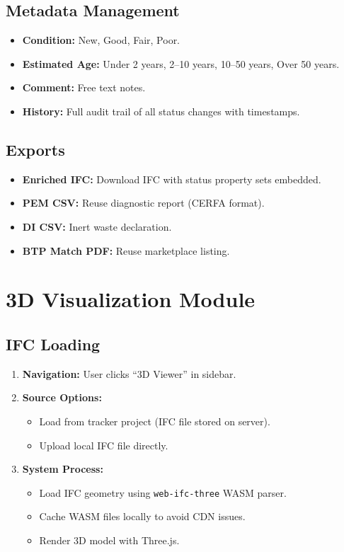 \documentclass[11pt,a4paper]{article}
\begin{document}
\subsection{Metadata Management}

\begin{itemize}
    \item \textbf{Condition:} New, Good, Fair, Poor.
    \item \textbf{Estimated Age:} Under 2 years, 2--10 years, 10--50 years, Over 50 years.
    \item \textbf{Comment:} Free text notes.
    \item \textbf{History:} Full audit trail of all status changes with timestamps.
\end{itemize}

\subsection{Exports}

\begin{itemize}
    \item \textbf{Enriched IFC:} Download IFC with status property sets embedded.
    \item \textbf{PEM CSV:} Reuse diagnostic report (CERFA format).
    \item \textbf{DI CSV:} Inert waste declaration.
    \item \textbf{BTP Match PDF:} Reuse marketplace listing.
\end{itemize}

\section{3D Visualization Module}

\subsection{IFC Loading}

\begin{enumerate}[leftmargin=*]
    \item \textbf{Navigation:} User clicks ``3D Viewer'' in sidebar.
    \item \textbf{Source Options:}
        \begin{itemize}
            \item Load from tracker project (IFC file stored on server).
            \item Upload local IFC file directly.
        \end{itemize}
    \item \textbf{System Process:} 
        \begin{itemize}
            \item Load IFC geometry using \texttt{web-ifc-three} WASM parser.
            \item Cache WASM files locally to avoid CDN issues.
            \item Render 3D model with Three.js.
        \end{itemize}
\end{enumerate}
\end{document}
